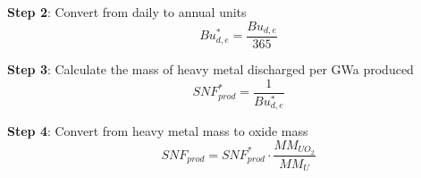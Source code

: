 \textbf{Step 2}: Convert from daily to annual units
\begin{equation}
\label{eq:snf_production_step2}
\quad Bu_{d,e}^* = \frac{Bu_{d,e}}{365}
\end{equation}

\textbf{Step 3}: Calculate the mass of heavy metal discharged per GWa produced
\begin{equation}
\label{eq:snf_production_step3}
\quad SNF_{prod}^* = \frac{1}{Bu_{d,e}^*}
\end{equation}

\textbf{Step 4}: Convert from heavy metal mass to oxide mass
\begin{equation}
\label{eq:snf_production_step4}
\quad SNF_{prod} = SNF_{prod}^* \cdot \frac{MM_{UO_2}}{MM_U}
\end{equation}


